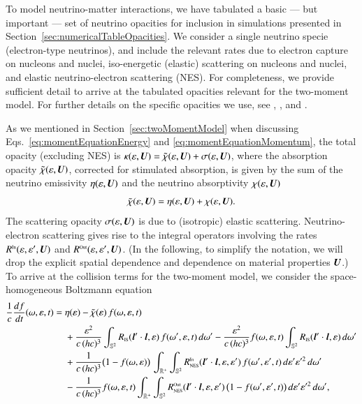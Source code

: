 \documentclass[11pt,letterpaper,twoside,english,final]{article}
\newcommand{\NES}{\mbox{\tiny NES}}
\begin{document}
To model neutrino-matter interactions, we have tabulated a basic --- but important --- set of neutrino opacities for inclusion in simulations presented in Section~\ref{sec:numericalTableOpacities}.  
We consider a single neutrino specie (electron-type neutrinos), and include the relevant rates due to electron capture on nucleons and nuclei, iso-energetic (elastic) scattering on nucleons and nuclei, and elastic neutrino-electron scattering (NES).  
For completeness, we provide sufficient detail to arrive at the tabulated opacities relevant for the two-moment model.  
For further details on the specific opacities we use, see \citet{bruenn_1985}, \citet{mezzacappaBruenn_1993a}, and \citet{mezzacappaBruenn_1993c}.  

As we mentioned in Section~\ref{sec:twoMomentModel} when discussing Eqs.~\eqref{eq:momentEquationEnergy} and \eqref{eq:momentEquationMomentum}, the total opacity (excluding NES) is $\kappa(\varepsilon,\boldsymbol{U})=\tilde{\chi}(\varepsilon,\boldsymbol{U})+\sigma(\varepsilon,\boldsymbol{U})$, where the absorption opacity $\tilde{\chi}(\varepsilon,\boldsymbol{U})$, corrected for stimulated absorption, is given by the sum of the neutrino emissivity $\eta(\varepsilon,\boldsymbol{U})$ and the neutrino absorptivity $\chi(\varepsilon,\boldsymbol{U})$
\begin{equation}
  \tilde{\chi}(\varepsilon,\boldsymbol{U}) = \eta(\varepsilon,\boldsymbol{U}) + \chi(\varepsilon,\boldsymbol{U}). 
\end{equation}
The scattering opacity $\sigma(\varepsilon,\boldsymbol{U})$ is due to (isotropic) elastic scattering.   
Neutrino-electron scattering gives rise to the integral operators involving the rates $R^{\mbox{\tiny In}}(\varepsilon,\varepsilon',\boldsymbol{U})$ and $R^{\mbox{\tiny Out}}(\varepsilon,\varepsilon',\boldsymbol{U})$.  
(In the following, to simplify the notation, we will drop the explicit spatial dependence and dependence on material properties $\boldsymbol{U}$.)  
To arrive at the collision terms for the two-moment model, we consider the space-homogeneous Boltzmann equation \citep[e.g., Eq.~(7) in][]{mezzacappaBruenn_1993c}
\begin{align}
  \f{1}{c}\deriv{f}{t}(\omegaNu,\epsilonNu,t)
  & = \eta(\epsilonNu) - \tilde{\chi}(\epsilonNu)\,f(\omegaNu,\epsilonNu,t) \nonumber \\
  & \hspace{12pt}
  + \frac{\epsilonNu^2}{c\,(hc)^3} \int_{\bbS^{2}} R_{\IS}(\bl'\cdot\bl,\epsilonNu)\,f(\omega', \epsilonNu,t)\,d\omegaNu'
  - \frac{\epsilonNu^2}{c\,(hc)^3} f(\omegaNu,\epsilonNu,t) \int_{\bbS^{2}} R_{\IS}(\bl'\cdot\bl,\epsilonNu)\,d\omega' \nonumber \\
  & \hspace{12pt} 
  + \frac{1}{c\,(hc)^3}\big(1- f(\omegaNu,\epsilonNu)\big) \, 
  \int_{\bbR^{+}} \int_{\bbS^{2}}  R^{\In}_{\NES} (\bl'\cdot\bl,\epsilonNu,\epsilonNu')\,f(\omega',\epsilonNu',t)\,d\epsilonNu' \epsilonNu'^{2}\,d\omega' \nonumber \\
  & \hspace{12pt} 
  - \frac{1}{c\,(hc)^3} f(\omegaNu,\epsilonNu,t) \int_{\bbR^{+}} 
  \int_{\bbS^{2}}  R^{\Out}_{\NES} (\bl'\cdot\bl,\epsilonNu,\epsilonNu^{\prime})\,\big(1-f(\omegaNu',\epsilonNu',t )\big)\,d\epsilonNu' \epsilonNu'^{2}\,d\omegaNu',
  \label{eq:homogeneousBoltzmann}
\end{align}
\end{document}
